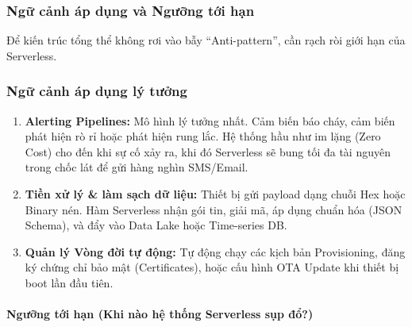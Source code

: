 \subsubsection{Ngữ cảnh áp dụng và Ngưỡng tới hạn}
\label{subsec:serverless-thresholds}

Để kiến trúc tổng thể không rơi vào bẫy ``Anti-pattern'', cần rạch ròi giới hạn của Serverless.

\subsubsection*{Ngữ cảnh áp dụng lý tưởng}

\begin{enumerate}
    \item \textbf{Alerting Pipelines:}
    Mô hình lý tưởng nhất. Cảm biến báo cháy, cảm biến phát hiện rò rỉ hoặc phát hiện rung lắc. Hệ thống hầu như im lặng (Zero Cost) cho đến khi sự cố xảy ra, khi đó Serverless sẽ bung tối đa tài nguyên trong chốc lát để gửi hàng nghìn SMS/Email.

    \item \textbf{Tiền xử lý \& làm sạch dữ liệu:}
    Thiết bị gửi payload dạng chuỗi Hex hoặc Binary nén. Hàm Serverless nhận gói tin, giải mã, áp dụng chuẩn hóa (JSON Schema), và đẩy vào Data Lake hoặc Time-series DB.

    \item \textbf{Quản lý Vòng đời tự động:}
    Tự động chạy các kịch bản Provisioning, đăng ký chứng chỉ bảo mật (Certificates), hoặc cấu hình OTA Update khi thiết bị boot lần đầu tiên.
\end{enumerate}

\paragraph*{Ngưỡng tới hạn (Khi nào hệ thống Serverless sụp đổ?)}


